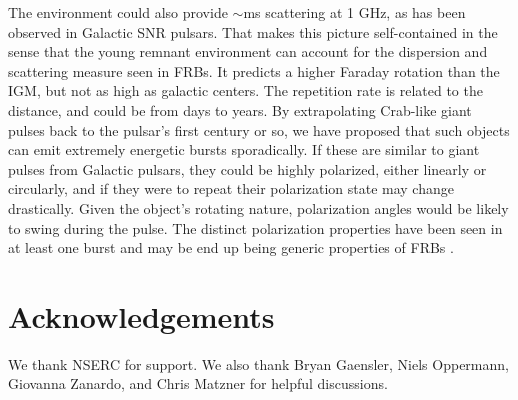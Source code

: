 \documentclass[useAMS,usenatbib]{mn2e}
\begin{document}
The environment could also provide $\sim$ms scattering at 1 GHz, as has been 
observed in Galactic SNR pulsars. 
That makes this picture self-contained in the sense that
the young remnant environment can account for the dispersion 
and scattering measure seen in FRBs.  It predicts a higher Faraday
rotation than the IGM, but not as high as galactic centers. The
repetition rate is related to the distance, and could be from days to
years. 
By extrapolating Crab-like giant pulses back to the pulsar's first century or so,
we have proposed that such objects can emit extremely energetic bursts sporadically. 
If these are similar to giant pulses from Galactic pulsars, they could be highly polarized, 
either linearly or circularly, and if they were to repeat their polarization state may 
change drastically. Given the object's rotating nature, polarization
 angles would be likely to swing during the pulse. The distinct polarization properties
have been seen in at least one burst and may be end up being generic properties 
of FRBs \citep{2015arXiv151200529M}.
\\

\section{Acknowledgements}

We thank NSERC for support. We also thank Bryan Gaensler, Niels Oppermann, 
Giovanna Zanardo, and Chris Matzner for helpful discussions. 

\newcommand{\araa}{ARA\&A}   %
\newcommand{\afz}{Afz}       %
\newcommand{\aj}{AJ}         %
\newcommand{\azh}{AZh}       %
\newcommand{\aaa}{A\&A}      %
\newcommand{\aas}{A\&AS}     %
\newcommand{\aar}{A\&AR}     %
\newcommand{\apj}{ApJ}       %
\newcommand{\apjs}{ApJS}     %
\newcommand{\apjl}{ApJ}      %
\newcommand{\apss}{Ap\&SS}   %
\newcommand{\baas}{BAAS}     %
\newcommand{\jaa}{JA\&A}     %
\newcommand{\mnras}{MNRAS}   %
\newcommand{\nat}{Nat}       %
\newcommand{\pasj}{PASJ}     %
\newcommand{\pasp}{PASP}     %
\newcommand{\paspc}{PASPC}   %
\newcommand{\qjras}{QJRAS}   %
\newcommand{\sci}{Sci}       %
\newcommand{\solphys}{Solar Physics}       %
\newcommand{\sova}{SvA}      %
\newcommand{\aap}{A\&A}
\newcommand\jcap{{J. Cosmology Astropart. Phys.}}%
\newcommand{\prd}{Phys. Rev. D}

%




\label{lastpage}
\end{document}
